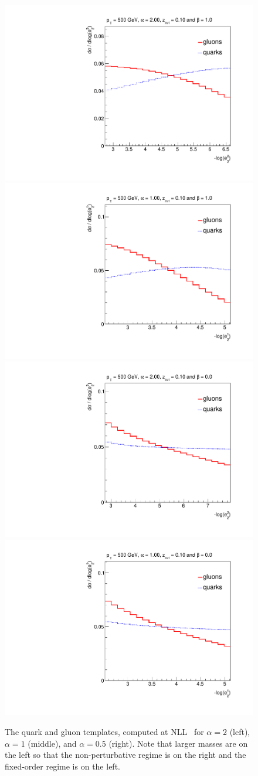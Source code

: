 \begin{figure}[h!]
\begin{center}
\includegraphics[width = 0.49\columnwidth]{figures/PDFs_alpha_20zcut1_beta_1023451324.pdf}\includegraphics[width = 0.49\columnwidth]{figures/PDFs_alpha_10zcut1_beta_1023451324.pdf}\\
\includegraphics[width = 0.49\columnwidth]{figures/PDFs_alpha_20zcut1_beta_023451324.pdf}\includegraphics[width = 0.49\columnwidth]{figures/PDFs_alpha_10zcut1_beta_023451324.pdf}
\end{center}
\caption{The quark and gluon templates, computed at
  NLL~\cite{Marzani:2017mva,Marzani:2017kqd} for $\alpha=2$ (left),
  $\alpha=1$ (middle), and $\alpha=0.5$ (right).  Note that larger
  masses are on the left so that the non-perturbative regime is on the
  right and the fixed-order regime is on the left. }
\label{fig:templates}
\end{figure}
	
